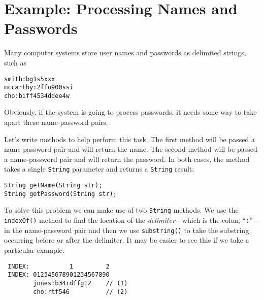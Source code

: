 \section{Example: Processing Names and Passwords}
\label{example-processing-namesand-passwords}
\noindent Many computer systems store user names and passwords as delimited
strings, such as

\begin{jjjlisting}
\begin{lstlisting}
smith:bg1s5xxx
mccarthy:2ffo900ssi
cho:biff4534ddee4w
\end{lstlisting}
\end{jjjlisting}


\noindent Obviously, if the system is going to process passwords,
it needs some way to take apart these name-password pairs.

Let's write methods to help perform this task.  The first method will
be passed a name-password pair and will return the name.  The second
method will be passed a name-password pair and will return the
password.  In both cases, the method takes a single {\tt String}
parameter and returns a {\tt String} result:

\begin{jjjlisting}
\begin{lstlisting}
String getName(String str);
String getPassword(String str);
\end{lstlisting}
\end{jjjlisting}

\noindent To solve this problem we can make use of two {\tt String} methods.  We
use the {\tt indexOf()} method to find the location of the {\it
delimiter}---which is the colon,  ``{\tt :}''---in the name-password pair
and then we use {\tt substring()} to take the substring occurring
before or after the delimiter.  It may be easier to see this if we
take a particular example:


\begin{jjjlisting}
\begin{lstlisting}
 INDEX:           1         2
 INDEX: 012345678901234567890
        jones:b34rdffg12    // (1)
        cho:rtf546          // (2)
\end{lstlisting}
\end{jjjlisting}

